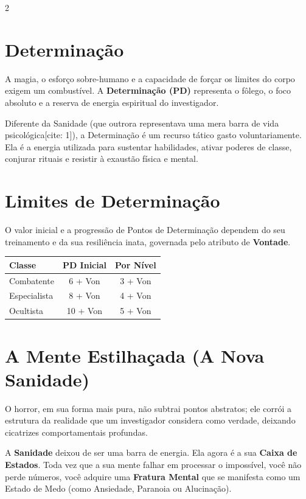 \documentclass[a4paper,11pt,openany]{book}
\begin{document}
\begin{multicols}{2}

\section{Determinação}

A magia, o esforço sobre-humano e a capacidade de forçar os limites do corpo exigem um combustível. A \textbf{Determinação (PD)} representa o fôlego, o foco absoluto e a reserva de energia espiritual do investigador.

Diferente da Sanidade (que outrora representava uma mera barra de vida psicológica[cite: 1]), a Determinação é um recurso tático gasto voluntariamente. Ela é a energia utilizada para sustentar habilidades, ativar poderes de classe, conjurar rituais e resistir à exaustão física e mental.

\section{Limites de Determinação}

O valor inicial e a progressão de Pontos de Determinação dependem do seu treinamento e da sua resiliência inata, governada pelo atributo de \textbf{Vontade}.

\begin{table}[H]
\centering
\sffamily
{}
\begin{tabular}{lcc}
\toprule
\textbf{Classe} & \textbf{PD Inicial} & \textbf{Por Nível} \\
\midrule
Combatente & 6 + Von & 3 + Von \\
Especialista & 8 + Von & 4 + Von \\
Ocultista & 10 + Von & 5 + Von \\
\bottomrule
\end{tabular}
\end{table}

\section{A Mente Estilhaçada (A Nova Sanidade)}

O horror, em sua forma mais pura, não subtrai pontos abstratos; ele corrói a estrutura da realidade que um investigador considera como verdade, deixando cicatrizes comportamentais profundas. 

A \textbf{Sanidade} deixou de ser uma barra de energia. Ela agora é a sua \textbf{Caixa de Estados}. Toda vez que a sua mente falhar em processar o impossível, você não perde números, você adquire uma \textbf{Fratura Mental} que se manifesta como um Estado de Medo (como Ansiedade, Paranoia ou Alucinação).


\end{multicols}
\end{document}
